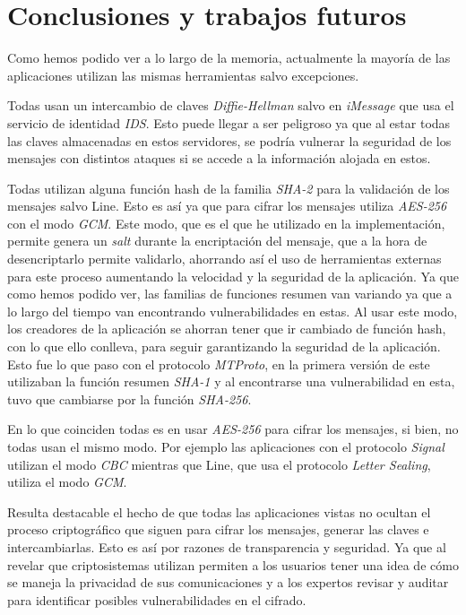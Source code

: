 \chapter{Conclusiones y trabajos futuros}
Como hemos podido ver a lo largo de la memoria, actualmente la mayoría de las aplicaciones utilizan las mismas herramientas salvo excepciones.\par
Todas usan un intercambio de claves \emph{Diffie-Hellman} salvo en \emph{iMessage} que usa el servicio de identidad \emph{IDS}. Esto puede llegar a ser peligroso ya que al estar todas las claves almacenadas en estos servidores, se podría vulnerar la seguridad de los mensajes con distintos ataques si se accede a la información alojada en estos.\par
Todas utilizan alguna función hash de la familia \emph{SHA-2} para la validación de los mensajes salvo Line. Esto es así ya que para cifrar los mensajes utiliza \emph{AES-256} con el modo \emph{GCM}. Este modo, que es el que he utilizado en la implementación, permite genera un \emph{salt} durante la encriptación del mensaje, que a la hora de desencriptarlo permite validarlo, ahorrando así el uso de herramientas externas para este proceso aumentando la velocidad y la seguridad de la aplicación. Ya que como hemos podido ver, las familias de funciones resumen van variando ya que a lo largo del tiempo van encontrando vulnerabilidades en estas. Al usar este modo, los creadores de la aplicación se ahorran tener que ir cambiado de función hash, con lo que ello conlleva, para seguir garantizando la seguridad de la aplicación. Esto fue lo que paso con el protocolo \emph{MTProto}, en la primera versión de este utilizaban la función resumen \emph{SHA-1} y al encontrarse una vulnerabilidad en esta, tuvo que cambiarse por la función \emph{SHA-256}.\par
En lo que coinciden todas es en usar \emph{AES-256} para cifrar los mensajes, si bien, no todas usan el mismo modo. Por ejemplo las aplicaciones con el protocolo \emph{Signal} utilizan el modo \emph{CBC} mientras que Line, que usa el protocolo \emph{Letter Sealing}, utiliza el modo \emph{GCM}. \par
Resulta destacable el hecho de que todas las aplicaciones vistas no ocultan el proceso criptográfico que siguen para cifrar los mensajes, generar las claves e intercambiarlas. Esto es así por razones de transparencia y seguridad. Ya que al revelar que criptosistemas utilizan permiten a los usuarios tener una idea de cómo se maneja la privacidad de sus comunicaciones y a los expertos revisar y auditar para identificar posibles vulnerabilidades en el cifrado.\par
